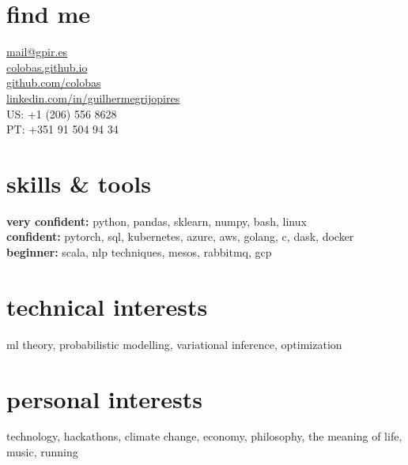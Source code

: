 \documentclass[]{colobas-cv}
\begin{document}

\begin{minipage}[t]{0.3\textwidth}
\section{find me}
  \vspace{7pt}
  \href{mailto:mail@gpir.es}{mail@gpir.es}\\
  \href{https://colobas.github.io}{colobas.github.io}\\
  \href{https://github.com/colobas}{github.com/colobas}\\
  \href{https://linkedin.com/in/guilhermegrijopires/}{linkedin.com/in/guilhermegrijopires}\\
  US: +1 (206) 556 8628\\
  PT: +351 91 504 94 34%
\end{minipage}
\hfill
\begin{minipage}[t]{0.3\textwidth}
\section{skills \& tools}
  \vspace{7pt}
  \textbf{very confident:} python, pandas, sklearn, numpy, bash, linux\\
  \textbf{confident:} pytorch, sql, kubernetes, azure, aws, golang, c, dask, docker\\
  \textbf{beginner:} scala, nlp techniques, mesos, rabbitmq, gcp%
\end{minipage}
\hfill
\begin{minipage}[t]{0.3\textwidth}
\section{technical interests}
  \vspace{7pt}
  ml theory, probabilistic modelling, variational inference, optimization%
  \vspace{15pt}
\section{personal interests}
  \vspace{7pt}
  technology, hackathons, climate change, economy, philosophy, the meaning of life,
  music, running
\end{minipage}

\vspace{0.5cm}
\end{document}
